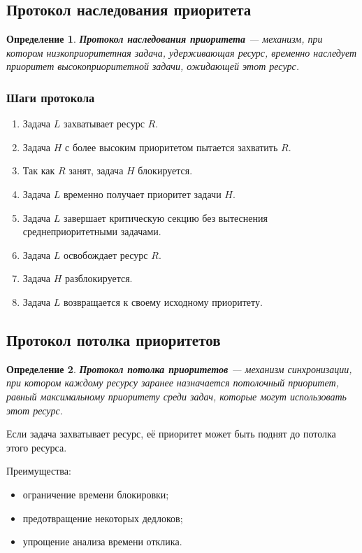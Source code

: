 \documentclass[12pt,a4paper]{article}
\newtheorem{definition}{Определение}
\begin{document}
\subsection{Протокол наследования приоритета}

\begin{definition}
\textbf{Протокол наследования приоритета} --- механизм, при котором низкоприоритетная задача, удерживающая ресурс, временно наследует приоритет высокоприоритетной задачи, ожидающей этот ресурс.
\end{definition}

\subsubsection{Шаги протокола}

\begin{enumerate}
    \item Задача $L$ захватывает ресурс $R$.
    \item Задача $H$ с более высоким приоритетом пытается захватить $R$.
    \item Так как $R$ занят, задача $H$ блокируется.
    \item Задача $L$ временно получает приоритет задачи $H$.
    \item Задача $L$ завершает критическую секцию без вытеснения среднеприоритетными задачами.
    \item Задача $L$ освобождает ресурс $R$.
    \item Задача $H$ разблокируется.
    \item Задача $L$ возвращается к своему исходному приоритету.
\end{enumerate}

\subsection{Протокол потолка приоритетов}

\begin{definition}
\textbf{Протокол потолка приоритетов} --- механизм синхронизации, при котором каждому ресурсу заранее назначается потолочный приоритет, равный максимальному приоритету среди задач, которые могут использовать этот ресурс.
\end{definition}

Если задача захватывает ресурс, её приоритет может быть поднят до потолка этого ресурса.

Преимущества:
\begin{itemize}
    \item ограничение времени блокировки;
    \item предотвращение некоторых дедлоков;
    \item упрощение анализа времени отклика.
\end{itemize}
\end{document}
